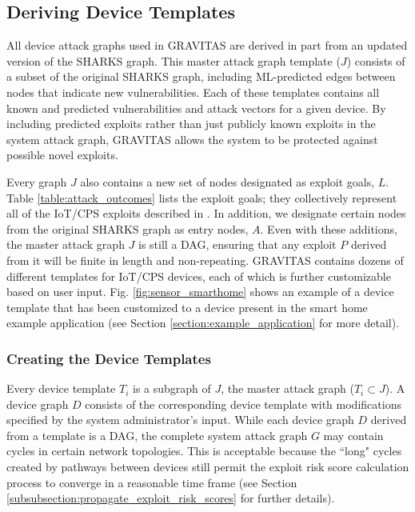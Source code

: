 \documentclass[10pt,journal,compsoc]{IEEEtran}
\begin{document}
\subsection{Deriving Device Templates}
\label{subsection:derive_device_templates}

\par All device attack graphs used in GRAVITAS are derived in part from an updated version of the SHARKS graph. This master attack graph template ($J$) consists of a subset of the original SHARKS graph, including ML-predicted edges between nodes that indicate new vulnerabilities. Each of these templates contains all known and predicted vulnerabilities and attack vectors for a given device. By including predicted exploits rather than just publicly known exploits in the system attack graph, GRAVITAS allows the system to be protected against possible novel exploits.
		
\par Every graph $J$ also contains a new set of nodes designated as exploit goals, $L$. Table \ref{table:attack_outcomes} lists the exploit goals; they collectively represent all of the IoT/CPS exploits described in \cite{mosenia2017comprehensive}. In addition, we designate certain nodes from the original SHARKS graph as entry nodes, $A$. Even with these additions, the master attack graph $J$ is still a DAG, ensuring that any exploit $P$ derived from it will be finite in length and non-repeating. GRAVITAS contains dozens of different templates for IoT/CPS devices, each of which is further customizable based on user input. Fig. \ref{fig:sensor_smarthome} shows an example of a device template that has been customized to a device present in the smart home example application (see Section \ref{section:example_application} for more detail).

\subsubsection{Creating the Device Templates}
\label{subsubsection:create_the_device_templates}

Every device template $T_i$ is a subgraph of $J$, the master attack graph ($T_i \subset J$). A device 
graph $D$ consists of the corresponding device template with modifications specified by the system administrator's 
input. While each device graph $D$ derived from a template is a DAG, the complete system attack graph 
$G$ may contain cycles in certain network topologies. This is acceptable because the ``long" cycles 
created by pathways between devices still permit the exploit risk score calculation 
process to converge in a reasonable time frame (see Section \ref{subsubsection:propagate_exploit_risk_scores} for 
further details). 
\end{document}
